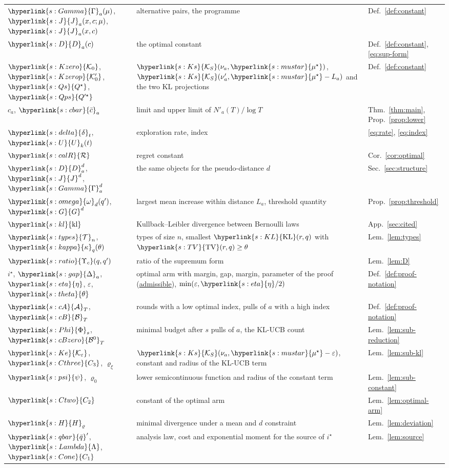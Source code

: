 \documentclass[11pt]{article}
\newcommand{\sy}[2]{{\hyperlink{#1}{#2}}}
\newcommand{\term}[2]{\hyperlink{#1}{#2}}
\newcommand{\KL}{\sy{s:KL}{\mathrm{KL}}}
\newcommand{\TV}{\sy{s:TV}{\mathrm{TV}}}
\newcommand{\Ks}{\sy{s:Ks}{\mathcal{K}_{S}}}
\newcommand{\mus}{\sy{s:mustar}{\mu^{\star}}}
\newcommand{\Pairs}{\sy{s:Gamma}{\Gamma}}
\newcommand{\Jf}{\sy{s:J}{J}}
\newcommand{\Dc}{\sy{s:D}{D}}
\newcommand{\Ko}{\sy{s:Kzero}{\mathcal{K}_{0}}}
\newcommand{\Kop}{\sy{s:Kzerop}{\mathcal{K}'_{0}}}
\newcommand{\Qs}{\sy{s:Qs}{Q^{\star}}}
\newcommand{\Qps}{\sy{s:Qps}{Q'^{\star}}}
\newcommand{\Rat}{\sy{s:ratio}{\Upsilon_{c}}}
\newcommand{\cbar}{\sy{s:cbar}{\bar c}}
\newcommand{\Rc}{\sy{s:calR}{\mathcal{R}}}
\newcommand{\om}{\sy{s:omega}{\omega}}
\newcommand{\Gd}{\sy{s:G}{G}}
\newcommand{\dl}{\sy{s:delta}{\delta}}
\newcommand{\Ix}{\sy{s:U}{U}}
\newcommand{\gap}{\sy{s:gap}{\Delta}}
\newcommand{\etam}{\sy{s:eta}{\eta}}
\newcommand{\thet}{\sy{s:theta}{\theta}}
\newcommand{\cA}{\sy{s:cA}{\mathcal{A}}}
\newcommand{\cB}{\sy{s:cB}{\mathcal{B}}}
\newcommand{\cBz}{\sy{s:cBzero}{\mathcal{B}^{0}}}
\newcommand{\Ph}{\sy{s:Phi}{\Phi}}
\newcommand{\Ke}{\sy{s:Ke}{\mathcal{K}_{\varepsilon}}}
\newcommand{\psif}{\sy{s:psi}{\psi}}
\newcommand{\qbar}{\sy{s:qbar}{\bar q}}
\newcommand{\Lam}{\sy{s:Lambda}{\Lambda}}
\newcommand{\Cone}{\sy{s:Cone}{C_{1}}}
\newcommand{\Ctwo}{\sy{s:Ctwo}{C_{2}}}
\newcommand{\Cthree}{\sy{s:Cthree}{C_{3}}}
\newcommand{\Hr}{\sy{s:H}{H}}
\newcommand{\kap}{\sy{s:kappa}{\kappa}}
\newcommand{\Tn}{\sy{s:types}{\mathcal{T}}}
\newcommand{\kl}{\sy{s:kl}{\mathrm{kl}}}
\begin{document}
\begin{center}
\begin{tabular}{@{}p{}p{}p{}@{}}
\raggedright $\Pairs_a(\mu)$, $\Jf_a(x,c;\mu)$, $\Jf_a(x,c)$ & \raggedright alternative pairs, the programme & \raggedright Def.~\ref{def:constant}\tabularnewline
\raggedright $\Dc_a(c)$ & \raggedright the optimal constant & \raggedright Def.~\ref{def:constant}, \eqref{eq:sup-form}\tabularnewline
\raggedright $\Ko$, $\Kop$, $\Qs$, $\Qps$ & \raggedright $\Ks(\nu_a,\mus)$, $\Ks(\nu'_a,\mus-L_a)$ and the two KL projections & \raggedright Def.~\ref{def:constant}\tabularnewline
\raggedright $c_a$, $\cbar_a$ & \raggedright limit and upper limit of $N'_a(T)/\log T$ & \raggedright Thm.~\ref{thm:main}, Prop.~\ref{prop:lower}\tabularnewline
\raggedright $\dl_t$, $\Ix_k(t)$ & \raggedright exploration rate, index & \raggedright \eqref{eq:rate}, \eqref{eq:index}\tabularnewline
\raggedright $\Rc$ & \raggedright regret constant & \raggedright Cor.~\ref{cor:optimal}\tabularnewline
\raggedright $\Dc^d_a$, $\Jf^d$, $\Pairs^d_a$ & \raggedright the same objects for the pseudo-distance $d$ & \raggedright Sec.~\ref{sec:structure}\tabularnewline
\raggedright $\om_d(q')$, $\Gd^d$ & \raggedright largest mean increase within distance $L_a$, threshold quantity & \raggedright Prop.~\ref{prop:threshold}\tabularnewline
\raggedright $\kl$ & \raggedright Kullback--Leibler divergence between Bernoulli laws & \raggedright App.~\ref{sec:cited}\tabularnewline
\raggedright $\Tn_n$, $\kap_q(\theta)$ & \raggedright types of size $n$, smallest $\KL(r,q)$ with $\TV(r,q)\ge\theta$ & \raggedright Lem.~\ref{lem:types}\tabularnewline
\raggedright $\Rat(q,q')$ & \raggedright ratio of the supremum form & \raggedright Lem.~\ref{lem:D}\tabularnewline
\raggedright $i^\star$, $\gap_a$, $\etam$, $\varepsilon$, $\thet$ & \raggedright optimal arm with margin, gap, margin, parameter of the proof (\term{w:adm}{admissible}), $\min(\varepsilon,\etam/2)$ & \raggedright Def.~\ref{def:proof-notation}\tabularnewline
\raggedright $\cA_T$, $\cB_T$ & \raggedright rounds with a low optimal index, pulls of $a$ with a high index & \raggedright Def.~\ref{def:proof-notation}\tabularnewline
\raggedright $\Ph_s$, $\cBz_T$ & \raggedright minimal budget after $s$ pulls of $a$, the KL-UCB count & \raggedright Lem.~\ref{lem:sub-reduction}\tabularnewline
\raggedright $\Ke$, $\Cthree$, $\varrho_\xi$ & \raggedright $\Ks(\nu_a,\mus-\varepsilon)$, constant and radius of the KL-UCB term & \raggedright Lem.~\ref{lem:sub-kl}\tabularnewline
\raggedright $\psif$, $\varrho_0$ & \raggedright lower semicontinuous function and radius of the constant term & \raggedright Lem.~\ref{lem:sub-constant}\tabularnewline
\raggedright $\Ctwo$ & \raggedright constant of the optimal arm & \raggedright Lem.~\ref{lem:optimal-arm}\tabularnewline
\raggedright $\Hr_\varrho$ & \raggedright minimal divergence under a mean and $d$ constraint & \raggedright Lem.~\ref{lem:deviation}\tabularnewline
\raggedright $\qbar'$, $\Lam$, $\Cone$ & \raggedright analysis law, cost and exponential moment for the source of $i^\star$ & \raggedright Lem.~\ref{lem:source}\tabularnewline
\bottomrule
\end{tabular}
\end{center}



\end{document}

